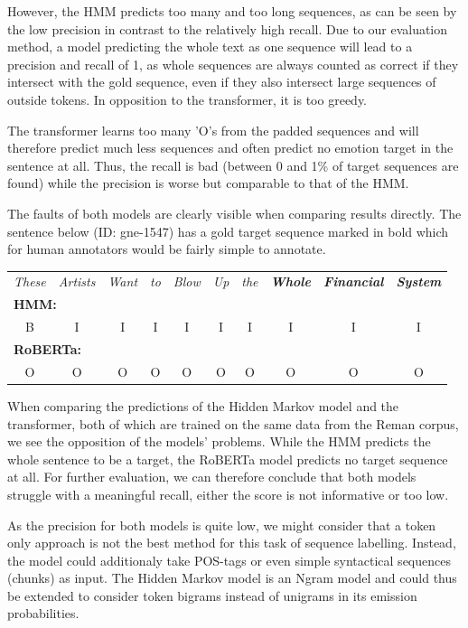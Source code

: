 \documentclass[12pt,pdftex,a4paper]{scrartcl}
\begin{document}
However, the HMM predicts too many and too long sequences, as can be seen by the low precision in contrast to the relatively high recall. Due to our evaluation method, a model predicting the whole text as one sequence will lead to a precision and recall of 1, as whole sequences are always counted as correct if they intersect with the gold sequence, even if they also intersect large sequences of outside tokens. In opposition to the transformer, it is too greedy.

The transformer learns too many 'O's from the padded sequences and will therefore predict much less sequences and often predict no emotion target in the sentence at all. Thus, the recall is bad (between 0 and 1\% of target sequences are found) while the precision is worse but comparable to that of the HMM. 

The faults of both models are clearly visible when comparing results directly. The sentence below (ID: gne-1547) has a gold target sequence marked in bold which for human annotators would be fairly simple to annotate.


\begin{tabular}{cccccccccc}
\textit{These} & \textit{Artists} & \textit{Want} & \textit{to} & \textit{Blow} & \textit{Up} & \textit{the} & \textbf{\textit{Whole}} & \textbf{\textit{Financial}} & \textbf{\textit{System}}
\medskip\\
\multicolumn{10}{l}{\textbf{HMM:}}\\
B & I & I & I & I & I & I & I & I & I\\
\multicolumn{10}{l}{\textbf{RoBERTa:}}\\
O & O & O & O & O & O & O & O & O & O\\
\end{tabular}

When comparing the predictions of the Hidden Markov model and the transformer, both of which are trained on the same data from the Reman corpus, we see the opposition of the models' problems. While the HMM predicts the whole sentence to be a target, the RoBERTa model predicts no target sequence at all. For further evaluation, we can therefore conclude that both models struggle with a meaningful recall, either the score is not informative or too low.

As the precision for both models is quite low, we might consider that a token only approach is not the best method for this task of sequence labelling. Instead, the model could additionaly take POS-tags or even simple syntactical sequences (chunks) as input. The Hidden Markov model is an Ngram model and could thus be extended to consider token bigrams instead of unigrams in its emission probabilities.
\end{document}
